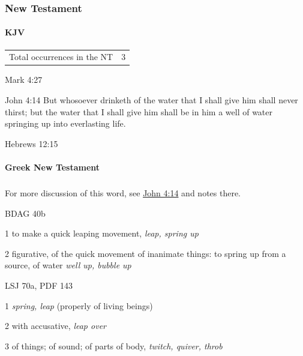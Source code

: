 	\subsubsection{New Testament} %
		\label{SPRING-NT}
	
		\paragraph{KJV}
			\label{SPRING-NT-KJV}
			
	
			\begin{tabular}{ll}
				Total occurrences in the NT & 3
			\end{tabular}
			
			\begin{compactdesc}
				\item[Mark 4:27]
				\item[John 4:14] But whosoever drinketh of the water that I shall give him shall never thirst; but the water that I shall give him shall be in him a well of water springing up into everlasting life.
				\item[Hebrews 12:15]
			\end{compactdesc}
			
		\paragraph{Greek New Testament} %
			\label{SPRING-GREEK}
		
			\subparagraph{\texorpdfstring{}{}}
				\label{HALLOMAI}
				
				For more discussion of this word, see \hyperref[JOHN-4-14]{John 4:14} and notes there.
			
				\begin{compactdesc}
					\item[BDAG 40b] \textbf{}
						\begin{compactitem}
							\item[1] to make a quick leaping movement, \textit{leap, spring up}
							\item[2] figurative, of the quick movement of inanimate things: to spring up from a source, of water \textit{well up, bubble up}
						\end{compactitem}
					\item[LSJ 70a, PDF 143] \textbf{}
						\begin{compactitem}
							\item[1] \textit{spring, leap} (properly of living beings)
							\item[2] with accusative, \textit{leap over}
							\item[3] of things; of sound; of parts of body, \textit{twitch, quiver, throb}
						\end{compactitem}
				\end{compactdesc}
				

